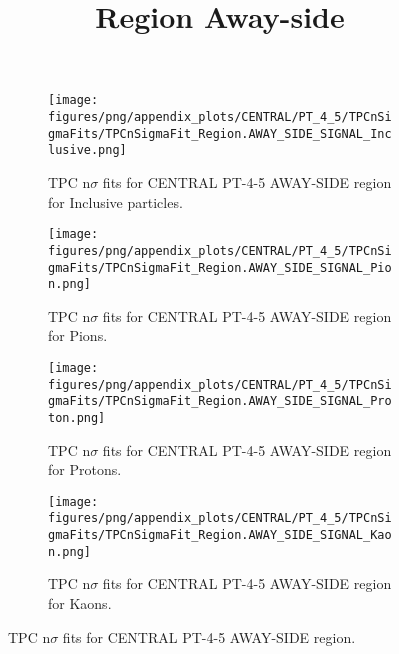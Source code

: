             \begin{figure}[H]
                \title{Region Away-side}
                \begin{subfigure}[b]{0.5\textwidth}
                    \centering
                    \texttt{[image: figures/png/appendix\_plots/CENTRAL/PT\_4\_5/TPCnSigmaFits/TPCnSigmaFit\_Region.AWAY\_SIDE\_SIGNAL\_Inclusive.png]}
                    \caption{TPC n$\sigma$ fits for CENTRAL PT-4-5 AWAY-SIDE region for Inclusive particles.}
                    \label{fig:appendix_CENTRAL_PT-4-5_AWAY_SIDE_SIGNAL_Inclusive}
                \end{subfigure}
                \begin{subfigure}[b]{0.5\textwidth}
                    \centering
                    \texttt{[image: figures/png/appendix\_plots/CENTRAL/PT\_4\_5/TPCnSigmaFits/TPCnSigmaFit\_Region.AWAY\_SIDE\_SIGNAL\_Pion.png]}
                    \caption{TPC n$\sigma$ fits for CENTRAL PT-4-5 AWAY-SIDE region for Pions.}
                    \label{fig:appendix_CENTRAL_PT-4-5_AWAY_SIDE_SIGNAL_Pion}
                \end{subfigure}
                \begin{subfigure}[b]{0.5\textwidth}
                    \centering
                    \texttt{[image: figures/png/appendix\_plots/CENTRAL/PT\_4\_5/TPCnSigmaFits/TPCnSigmaFit\_Region.AWAY\_SIDE\_SIGNAL\_Proton.png]}
                    \caption{TPC n$\sigma$ fits for CENTRAL PT-4-5 AWAY-SIDE region for Protons.}
                    \label{fig:appendix_CENTRAL_PT-4-5_AWAY_SIDE_SIGNAL_Proton}
                \end{subfigure}
                \begin{subfigure}[b]{0.5\textwidth}
                    \centering
                    \texttt{[image: figures/png/appendix\_plots/CENTRAL/PT\_4\_5/TPCnSigmaFits/TPCnSigmaFit\_Region.AWAY\_SIDE\_SIGNAL\_Kaon.png]}
                    \caption{TPC n$\sigma$ fits for CENTRAL PT-4-5 AWAY-SIDE region for Kaons.}
                    \label{fig:appendix_CENTRAL_PT-4-5_AWAY_SIDE_SIGNAL_Kaon}
                \end{subfigure}
                \caption{TPC n$\sigma$ fits for CENTRAL PT-4-5 AWAY-SIDE region.}
                \label{fig:appendix_CENTRAL_PT-4-5_AWAY_SIDE_SIGNAL}
            \end{figure}
